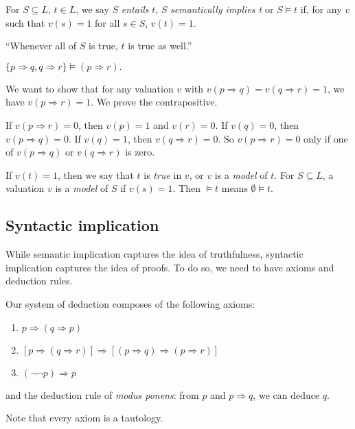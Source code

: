 \documentclass[a4paper]{article}
\begin{document}
\begin{defi}
  For $S\subseteq L$, $t\in L$, we say $S$ \emph{entails} $t$, $S$ \emph{semantically implies t} or $S\models t$ if, for any $v$ such that $v(s) = 1$ for all $s\in S$, $v(t) = 1$.

  ``Whenever all of $S$ is true, $t$ is true as well.''
\end{defi}

\begin{eg}
  $\{p\Rightarrow q, q\Rightarrow r\}\models (p\Rightarrow r).$

  We want to show that for any valuation $v$ with $v(p\Rightarrow q) = v(q\Rightarrow r) = 1$, we have $v(p\Rightarrow r) = 1$. We prove the contrapositive.

  If $v(p\Rightarrow r) = 0$, then $v(p) = 1$ and $v(r) = 0$. If $v(q) = 0$, then $v(p\Rightarrow q) = 0$. If $v(q) = 1$, then $v(q\Rightarrow r) = 0$. So $v(p\Rightarrow r) = 0$ only if one of $v(p\Rightarrow q)$ or $v(q\Rightarrow r)$ is zero. 
\end{eg}
\begin{defi}
  If $v(t) = 1$, then we say that $t$ is \emph{true} in $v$, or $v$ is a \emph{model} of $t$. For $S\subseteq L$, a valuation $v$ is a \emph{model} of $S$ if $v(s) = 1$. Then $\models t$ means $\emptyset \models t$. 
\end{defi}
\subsection{Syntactic implication}
While semantic implication captures the idea of truthfulness, syntactic implication captures the idea of proofs. To do so, we need to have axioms and deduction rules.

Our system of deduction composes of the following axioms:
\begin{enumerate}
  \item $p\Rightarrow(q\Rightarrow p)$
  \item $[p\Rightarrow(q\Rightarrow r)]\Rightarrow[(p\Rightarrow q)\Rightarrow(p \Rightarrow r)]$
  \item $(\neg\neg p)\Rightarrow p$
\end{enumerate}
and the deduction rule of \emph{modus ponens}: from $p$ and $p\Rightarrow q$, we can deduce $q$.

Note that every axiom is a tautology. 
\end{document}
